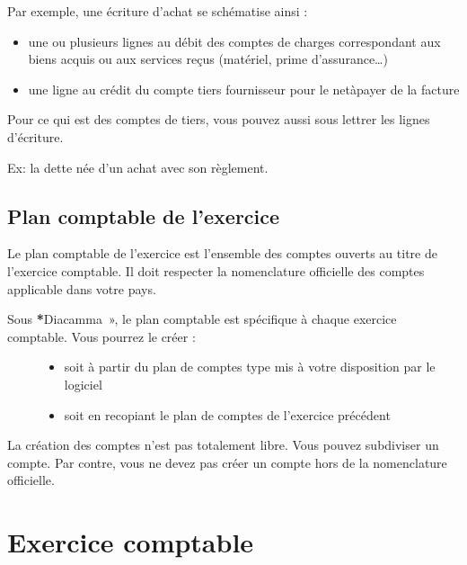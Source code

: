 \documentclass[a4paper,10pt,oneside,french]{sphinxmanual}
\begin{document}
\sphinxAtStartPar
Par exemple, une écriture d’achat se schématise ainsi :
\begin{itemize}
\item {} 
\sphinxAtStartPar
une ou plusieurs lignes au débit des comptes de charges correspondant aux biens acquis ou aux services reçus (matériel, prime d’assurance…)

\item {} 
\sphinxAtStartPar
une ligne au crédit du compte tiers fournisseur pour le net\sphinxhyphen{}à\sphinxhyphen{}payer de la facture

\end{itemize}

\sphinxAtStartPar
Pour ce qui est des comptes de tiers, vous pouvez aussi sous  lettrer les lignes d’écriture.

\sphinxAtStartPar
Ex: la dette née d’un achat avec son règlement.


\subsection{Plan comptable de l’exercice}
\label{\detokenize{accounting/definition:plan-comptable-de-l-exercice}}
\sphinxAtStartPar
Le plan comptable de l’exercice est l’ensemble des comptes ouverts au titre de l’exercice comptable. Il doit respecter  la nomenclature officielle des comptes applicable dans votre pays.
\begin{description}
\item[{Sous {\color{red}\bfseries{}*}Diacamma », le plan comptable est spécifique à chaque exercice comptable. Vous pourrez le créer :}] \leavevmode\begin{itemize}
\item {} 
\sphinxAtStartPar
soit  à partir du plan de comptes type mis à votre disposition par le logiciel

\item {} 
\sphinxAtStartPar
soit en recopiant le plan de comptes de l’exercice précédent

\end{itemize}

\end{description}

\sphinxAtStartPar
La création des comptes n’est pas totalement libre. Vous pouvez subdiviser un compte. Par contre, vous ne devez pas créer un compte hors de la nomenclature officielle.


\section{Exercice comptable}
\label{\detokenize{accounting/fiscalyear:exercice-comptable}}\label{\detokenize{accounting/fiscalyear::doc}}
\end{document}
